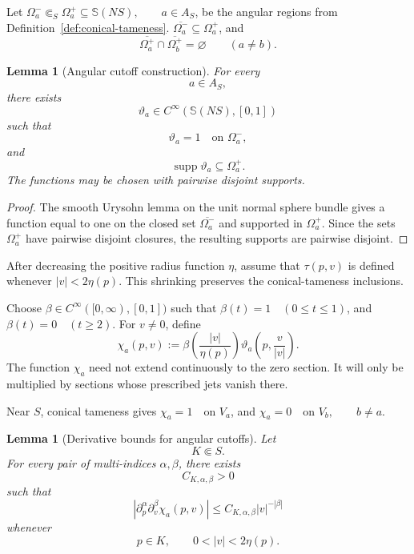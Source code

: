 \documentclass[11pt]{article}
\theoremstyle{plain}
\newtheorem{lemma}[theorem]{Lemma}
\theoremstyle{definition}
\begin{document}
Let
\(\Omega_a^-\Subset_S\Omega_a^+ \subseteq \mathbb S(NS), \qquad a\in A_S\),
be the angular regions from
Definition~\ref{def:conical-tameness}. \(\overline{\Omega_a^-} \subseteq \Omega_a^+\),
and
\[
  \overline{\Omega_a^+}
  \cap
  \overline{\Omega_b^+}
  =
  \varnothing
  \qquad
  (a\neq b).
\]

\begin{lemma}[Angular cutoff construction]
\label{lem:angular-cutoff-construction}
For every
\[
  a\in A_S,
\]
there exists
\[
  \vartheta_a
  \in
  C^\infty
  \left(
    \mathbb S(NS),
    [0,1]
  \right)
\]
such that
\[
  \vartheta_a=1
  \quad
  \text{on }\Omega_a^-,
\]
and
\[
  \operatorname{supp}\vartheta_a
  \subseteq
  \Omega_a^+.
\]
The functions may be chosen with pairwise disjoint supports.
\end{lemma}

\begin{proof}
The smooth Urysohn lemma on the unit normal sphere bundle gives a
function equal to one on the closed set
\(\overline{\Omega_a^-}\) and supported in \(\Omega_a^+\). Since the
sets \(\Omega_a^+\) have pairwise disjoint closures, the resulting
supports are pairwise disjoint.
\end{proof}

After decreasing the positive radius function \(\eta\), assume that \(\tau(p,v)\) is defined whenever
\(|v|<2\eta(p)\).
This shrinking preserves the conical-tameness inclusions.

Choose \(\beta\in C^\infty([0,\infty),[0,1])\) such that
\(\beta(t)=1 \quad (0\leq t\leq1)\),
and
\(\beta(t)=0 \quad (t\geq2)\).
For \(v\neq0\), define
\[
  \chi_a(p,v)
  :=
  \beta
  \left(
    \frac{|v|}{\eta(p)}
  \right)
  \vartheta_a
  \left(
    p,\frac{v}{|v|}
  \right).
\]
The function \(\chi_a\) need not extend continuously to the zero
section. It will only be multiplied by sections whose prescribed jets
vanish there.

Near \(S\), conical tameness gives
\(\chi_a=1 \quad \text{on }V_a\),
and
\(\chi_a=0 \quad \text{on }V_b, \qquad b\neq a\).

\begin{lemma}[Derivative bounds for angular cutoffs]
\label{lem:angular-cutoff-derivative-bounds}
Let
\[
  K\Subset S.
\]
For every pair of multi-indices \(\alpha,\beta\), there exists
\[
  C_{K,\alpha,\beta}>0
\]
such that
\[
  \boxed{
  \left|
    \partial_p^\alpha
    \partial_v^\beta
    \chi_a(p,v)
  \right|
  \leq
  C_{K,\alpha,\beta}
  |v|^{-|\beta|}
  }
\]
whenever
\[
  p\in K,
  \qquad
  0<|v|<2\eta(p).
\]
\end{lemma}
\end{document}
